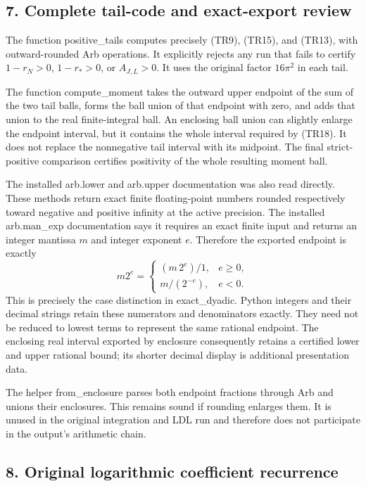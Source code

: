 \subsection{7. Complete tail-code and exact-export review}\label{complete-tail-code-and-exact-export-review}

The function positive\_tails computes precisely (TR9), (TR15), and (TR13), with outward-rounded Arb operations. It explicitly rejects any run that fails to certify \(1-r_N>0\), \(1-r_*>0\), or \(A_{J,L}>0\). It uses the original factor \(16\pi^2\) in each tail.

The function compute\_moment takes the outward upper endpoint of the sum of the two tail balls, forms the ball union of that endpoint with zero, and adds that union to the real finite-integral ball. An enclosing ball union can slightly enlarge the endpoint interval, but it contains the whole interval required by (TR18). It does not replace the nonnegative tail interval with its midpoint. The final strict-positive comparison certifies positivity of the whole resulting moment ball.

The installed arb.lower and arb.upper documentation was also read directly. These methods return exact finite floating-point numbers rounded respectively toward negative and positive infinity at the active precision. The installed arb.man\_exp documentation says it requires an exact finite input and returns an integer mantissa \(m\) and integer exponent \(e\). Therefore the exported endpoint is exactly \[
 m2^e=
 \begin{cases}
 (m\,2^e)/1,&e\geq0,\\
 m/(2^{-e}),&e<0.
 \end{cases}
 \tag{TR25}
\] This is precisely the case distinction in exact\_dyadic. Python integers and their decimal strings retain these numerators and denominators exactly. They need not be reduced to lowest terms to represent the same rational endpoint. The enclosing real interval exported by enclosure consequently retains a certified lower and upper rational bound; its shorter decimal display is additional presentation data.

The helper from\_enclosure parses both endpoint fractions through Arb and unions their enclosures. This remains sound if rounding enlarges them. It is unused in the original integration and LDL run and therefore does not participate in the output's arithmetic chain.

\subsection{8. Original logarithmic coefficient recurrence}\label{original-logarithmic-coefficient-recurrence}

